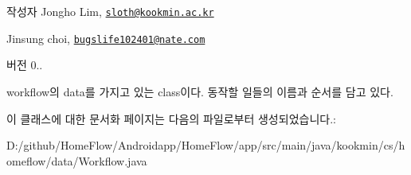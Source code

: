 \begin{DoxyAuthor}{작성자}
Jongho Lim, \href{mailto:sloth@kookmin.ac.kr}{\tt sloth@kookmin.\+ac.\+kr} 

Jinsung choi, \href{mailto:bugslife102401@nate.com}{\tt bugslife102401@nate.\+com} 
\end{DoxyAuthor}
\begin{DoxyVersion}{버전}
0..
\end{DoxyVersion}
workflow의 data를 가지고 있는 class이다. 동작할 일들의 이름과 순서를 담고 있다. 

이 클래스에 대한 문서화 페이지는 다음의 파일로부터 생성되었습니다.\+:\begin{DoxyCompactItemize}
\item 
D\+:/github/\+Home\+Flow/\+Androidapp/\+Home\+Flow/app/src/main/java/kookmin/cs/homeflow/data/Workflow.\+java\end{DoxyCompactItemize}
